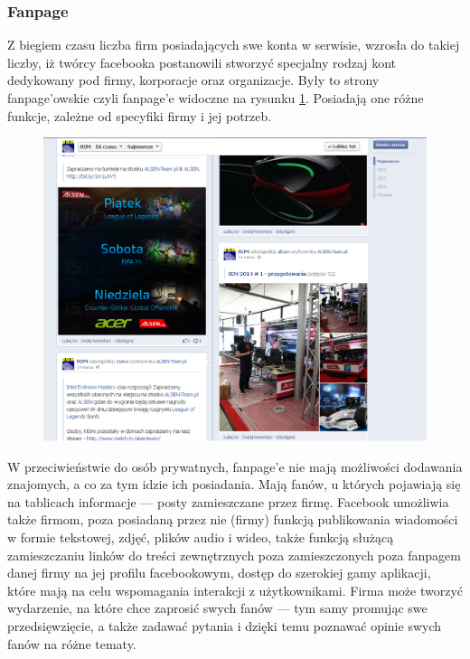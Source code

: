 
\subsubsection{Fanpage}
Z biegiem czasu liczba firm posiadających swe konta w serwisie, wzrosła do takiej liczby, iż twórcy facebooka postanowili stworzyć specjalny rodzaj kont dedykowany pod firmy, korporacje oraz organizacje. Były to strony fanpage'owskie czyli fanpage'e widoczne na rysunku \ref{fig:facebook-fanpage}. Posiadają one różne funkcje, zależne od specyfiki firmy i jej potrzeb.

\begin{figure}[!ht]
\centering
    \scalebox{0.4}
    {
        \includegraphics{images/lukasz/fan.png}
    }
    \label{fig:facebook-fanpage}
\end{figure}

W przeciwieństwie do osób prywatnych, fanpage'e nie mają możliwości dodawania znajomych, a co za tym idzie ich posiadania. Mają fanów, u których pojawiają się na tablicach informacje --- posty zamieszczane przez firmę. Facebook umożliwia także firmom, poza posiadaną przez nie (firmy) funkcją publikowania wiadomości w formie tekstowej, zdjęć, plików audio i wideo, także funkcją służącą zamieszczaniu linków do treści zewnętrznych poza zamieszczonych poza fanpagem danej firmy na jej profilu facebookowym, dostęp do szerokiej gamy aplikacji, które mają na celu wspomagania interakcji z użytkownikami. Firma może tworzyć wydarzenie, na które chce zaprosić swych fanów --- tym samy promując swe przedsięwzięcie, a także zadawać pytania i dzięki temu poznawać opinie swych fanów na różne tematy.


